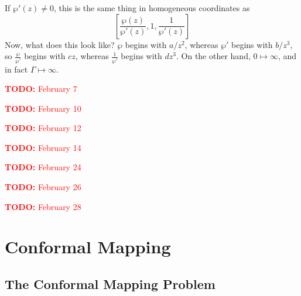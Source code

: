 \documentclass{article}
\newcommand{\TODO}[1]{\begin{center}\huge{\textcolor{red}{\textbf{TODO:} #1}}\end{center}}
\begin{document}
If \(\wp'(z) \neq 0\), this is the same thing in homogeneous coordinates as
\[\left[\frac{\wp(z)}{\wp'(z)}, 1, \frac{1}{\wp'(z)}\right]\]
Now, what does this look like? \(\wp\) begins with \(a/z^2\), whereas \(\wp'\) begins with \(b/z^3\), so \(\frac{\wp}{\wp'}\) begins with \(cz\), whereas \(\frac{1}{\wp'}\) begins with \(dz^3\). On the other hand, \(0 \mapsto \infty\), and in fact \(\Gamma \mapsto \infty\).

\TODO{February 7}

\TODO{February 10}

\TODO{February 12}

\TODO{February 14}

\TODO{February 24}

\TODO{February 26}

\TODO{February 28}

\section{Conformal Mapping}

\subsection{The Conformal Mapping Problem}
\end{document}
